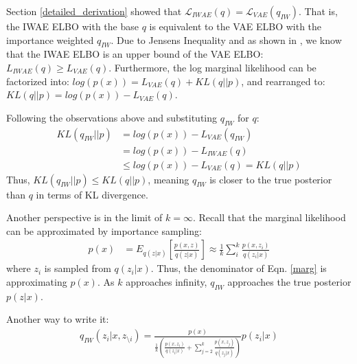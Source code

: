 \documentclass{article} %
\begin{document}
Section \ref{detailed_derivation} showed that $\mathcal{L}_{IWAE}(q) = \mathcal{L}_{VAE}(q_{IW})$. That is, the IWAE ELBO with the base $q$ is equivalent to the VAE ELBO with the importance weighted $q_{IW}$. Due to Jensen\textquotesingle s Inequality and as shown in \cite{burda2015importance}, we know that the IWAE ELBO is an upper bound of the VAE ELBO: ${L}_{IWAE}(q) \geq {L}_{VAE}(q)$. Furthermore, the log marginal likelihood can be factorized into: $log(p(x)) = {L}_{VAE}(q) + KL(q||p)$, and rearranged to: $KL(q||p) = log(p(x)) - {L}_{VAE}(q)$.

Following the observations above and substituting $q_{IW}$ for $q$:
\begin{align} 
    KL(q_{IW}||p) &= log(p(x)) - {L}_{VAE}(q_{IW}) \\
    &= log(p(x)) - {L}_{IWAE}(q) \\
    &\leq log(p(x)) - {L}_{VAE}(q) = KL(q||p)
\end{align}
Thus, $KL(q_{IW}||p) \leq KL(q||p)$, meaning $q_{IW}$ is closer to the true posterior than $q$ in terms of KL divergence. 

Another perspective is in the limit of ${k=\infty}$. Recall that the marginal likelihood can be approximated by importance sampling:
\begin{align} 
    p(x) &= E_{q(z|x)}\left[\frac{p(x,z)}{q(z|x)} \right] \approx \frac{1}{k}\sum_i^k \frac{p(x,z_i)}{q(z_i|x)}
\end{align}
where $z_i$ is sampled from $q(z_i|x)$. Thus, the denominator of Eqn. \ref{marg} is approximating $p(x)$. As $k$ approaches infinity, $q_{IW}$ approaches the true posterior $p(z|x)$.





Another way to write it:
\begin{align} 
q_{IW}(z_i|x,z_{\setminus i}) =  \frac{p(x)}{  \frac{1}{k} \left( \frac{p(x,z_i)}{q(z_i|x)}+ \sum_{j=2}^k \frac{p(x,z_j)}{q(z_j|x)} \right) }  p(z_i|x)
\end{align}
\end{document}
